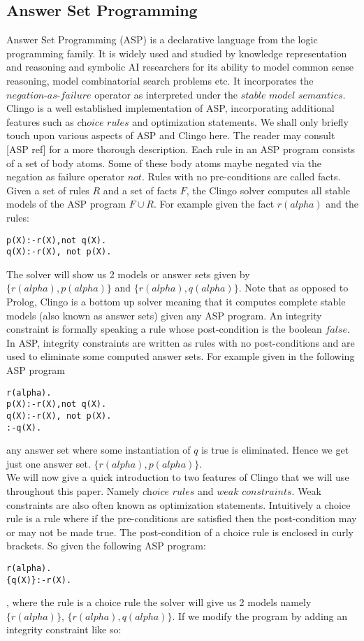 \subsection{Answer Set Programming}
Answer Set Programming (ASP) is a declarative language from the logic programming family. It is widely used and studied by knowledge representation and reasoning and symbolic AI researchers for its ability to model common sense reasoning, model combinatorial search problems etc. It incorporates the $\textit{negation-as-failure}$ operator as interpreted under the $\textit{stable model semantics}$. Clingo is a well established implementation of ASP, incorporating additional features such as $\textit{choice rules}$ and optimization statements. We shall only briefly touch upon various aspects of ASP and Clingo here. The reader may consult [ASP ref] for a more thorough description. Each rule in an ASP program consists of a set of body atoms. Some of these body atoms maybe negated via the negation as failure operator $not$. Rules with no pre-conditions are called facts. Given a set of rules $R$ and a set of facts $F$, the Clingo solver computes all stable models of the ASP program $F\cup R$. For example given the fact $r(alpha)$ and the rules:
\begin{lstlisting}[frame=none]
p(X):-r(X),not q(X).
q(X):-r(X), not p(X).
\end{lstlisting}
The solver will show us 2 models or answer sets given by\\ $\{r(alpha),p(alpha)\}$ and $\{r(alpha),q(alpha)\}$. Note that as opposed to Prolog, Clingo is a bottom up solver meaning that it computes complete stable models (also known as answer sets) given any ASP program. An integrity constraint is formally speaking a rule whose post-condition is the boolean $false$. In ASP, integrity constraints are written as rules with no post-conditions and are used to eliminate some computed answer sets. For example given in the following ASP program
\begin{lstlisting}[frame=none]
r(alpha).
p(X):-r(X),not q(X).
q(X):-r(X), not p(X).
:-q(X).
\end{lstlisting}
any answer set where some instantiation of $q$ is true is eliminated. Hence we get just one answer set. $\{r(alpha),p(alpha)\}$.\\ We will now give a quick introduction to two features of Clingo that we will use throughout this paper. Namely $\textit{choice rules}$ and $\textit{weak constraints}$. Weak constraints are also often known as optimization statements. Intuitively a choice rule is a rule where if the pre-conditions are satisfied then the post-condition may or may not be made true. The post-condition of a choice rule is enclosed in curly brackets. So given the following ASP program:\begin{lstlisting}[frame=none]
r(alpha).
{q(X)}:-r(X).
\end{lstlisting}, where the rule is a choice rule the solver will give us 2 models namely $\{r(alpha)\}$, $\{r(alpha),q(alpha)\}$. If we modify the program by adding an integrity constraint like so:
